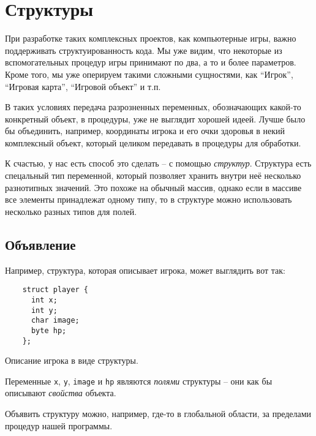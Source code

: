 \documentclass[../sparc.tex]{subfiles}
\begin{document}
\section{Структуры}

При разработке таких комплексных проектов, как компьютерные игры, важно
поддерживать структуированность кода.  Мы уже видим, что некоторые из
вспомогательных процедур игры принимают по два, а то и более параметров.  Кроме
того, мы уже оперируем такими сложными сущностями, как ``Игрок'', ``Игровая
карта'', ``Игровой объект'' и т.п.

В таких условиях передача разрозненных переменных, обозначающих какой-то
конкретный объект, в процедуры, уже не выглядит хорошей идеей.  Лучше было бы
объединить, например, координаты игрока и его очки здоровья в некий комплексный
объект, который целиком передавать в процедуры для обработки.

К счастью, у нас есть способ это сделать -- с помощью \emph{структур}.  Структура
есть спецальный тип переменной, который позволяет хранить внутри неё несколько
разнотипных значений.  Это похоже на обычный массив, однако если в массиве все
элементы принадлежат одному типу, то в структуре можно использовать несколько
разных типов для полей.

\subsection{Объявление}

Например, структура, которая описывает игрока, может выглядить вот так:

\begin{listing}[H]
  \begin{verbatim}
    struct player {
      int x;
      int y;
      char image;
      byte hp;
    };
  \end{verbatim}
  \caption{Описание игрока в виде структуры.}
  \label{listing:game-dev-structure}
\end{listing}

Переменные \texttt{x}, \texttt{y}, \texttt{image} и
\texttt{hp} являются \emph{полями} структуры -- они как бы описывают
\emph{свойства} объекта.

Объявить структуру можно, например, где-то в глобальной области, за пределами
процедур нашей программы.
\end{document}
